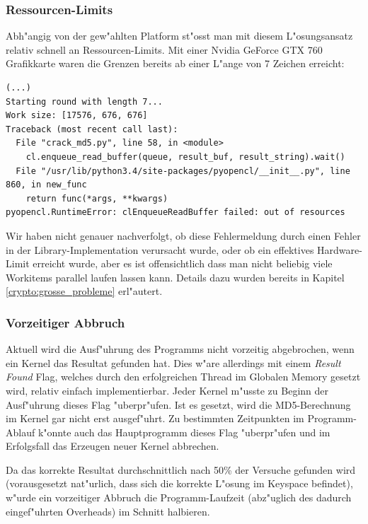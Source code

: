 \begin{refsection}
\subsubsection{Ressourcen-Limits}
\label{crypto:resourcenlimits}

Abh"angig von der gew"ahlten Platform st"osst man mit diesem L"osungsansatz
relativ schnell an Ressourcen-Limits. Mit einer Nvidia GeForce GTX 760
Grafikkarte waren die Grenzen bereits ab einer L"ange von 7 Zeichen erreicht:

\begin{small}
\begin{verbatim}
(...)
Starting round with length 7...
Work size: [17576, 676, 676]
Traceback (most recent call last):
  File "crack_md5.py", line 58, in <module>
    cl.enqueue_read_buffer(queue, result_buf, result_string).wait()
  File "/usr/lib/python3.4/site-packages/pyopencl/__init__.py", line 860, in new_func
    return func(*args, **kwargs)
pyopencl.RuntimeError: clEnqueueReadBuffer failed: out of resources
\end{verbatim}
\end{small}

Wir haben nicht genauer nachverfolgt, ob diese Fehlermeldung durch einen Fehler
in der Library-Implementation verursacht wurde, oder ob ein effektives
Hardware-Limit erreicht wurde, aber es ist offensichtlich dass man nicht
beliebig viele Workitems parallel laufen lassen kann. Details dazu wurden
bereits in Kapitel \ref{crypto:grosse_probleme} erl"autert.

\subsubsection{Vorzeitiger Abbruch}

Aktuell wird die Ausf"uhrung des Programms nicht vorzeitig abgebrochen, wenn ein
Kernel das Resultat gefunden hat. Dies w"are allerdings mit einem \textit{Result
Found} Flag, welches durch den erfolgreichen Thread im Globalen Memory gesetzt
wird, relativ einfach implementierbar. Jeder Kernel m"usste zu Beginn der
Ausf"uhrung dieses Flag "uberpr"ufen. Ist es gesetzt, wird die MD5-Berechnung im
Kernel gar nicht erst ausgef"uhrt. Zu bestimmten Zeitpunkten im Programm-Ablauf
k"onnte auch das Hauptprogramm dieses Flag "uberpr"ufen und im Erfolgsfall das
Erzeugen neuer Kernel abbrechen.

Da das korrekte Resultat durchschnittlich nach 50\% der Versuche gefunden wird
(vorausgesetzt nat"urlich, dass sich die korrekte L"osung im Keyspace befindet),
w"urde ein vorzeitiger Abbruch die Programm-Laufzeit (abz"uglich des dadurch
eingef"uhrten Overheads) im Schnitt halbieren.


\end{refsection}
